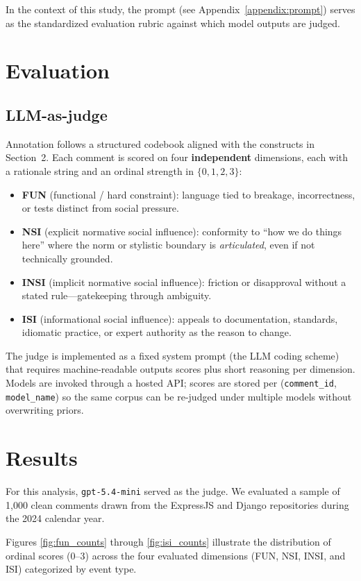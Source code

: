 \documentclass[10pt]{article}
\begin{document}
In the context of this study, the prompt (see Appendix~\ref{appendix:prompt}) serves as the standardized evaluation rubric against which model outputs are judged.


\section{Evaluation}
\subsection{LLM-as-judge}
Annotation follows a structured codebook aligned with the constructs in Section~2. Each comment is scored on four \textbf{independent} dimensions, each with a rationale string and an ordinal strength in $\{0,1,2,3\}$:
\begin{itemize}
  \item \textbf{FUN} (functional / hard constraint): language tied to breakage, incorrectness, or tests distinct from social pressure.
  \item \textbf{NSI} (explicit normative social influence): conformity to ``how we do things here'' where the norm or stylistic boundary is \textit{articulated}, even if not technically grounded.
  \item \textbf{INSI} (implicit normative social influence): friction or disapproval without a stated rule---gatekeeping through ambiguity.
  \item \textbf{ISI} (informational social influence): appeals to documentation, standards, idiomatic practice, or expert authority as the reason to change.
\end{itemize}

The judge is implemented as a fixed system prompt (the LLM coding scheme) that requires machine-readable outputs scores plus short reasoning per dimension. Models are invoked through a hosted API; scores are stored per (\texttt{comment\_id}, \texttt{model\_name}) so the same corpus can be re-judged under multiple models without overwriting priors.

\section{Results}
For this analysis, \texttt{gpt-5.4-mini} served as the judge. We evaluated a sample of 1,000 clean comments drawn from the ExpressJS and Django repositories during the 2024 calendar year.

Figures \ref{fig:fun_counts} through \ref{fig:isi_counts} illustrate the distribution of ordinal scores (0--3) across the four evaluated dimensions (FUN, NSI, INSI, and ISI) categorized by event type.
\end{document}
